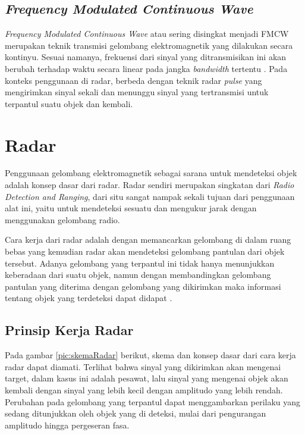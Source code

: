 \subsection{\textit{Frequency Modulated Continuous Wave}}
\textit{Frequency Modulated Continuous Wave} atau sering disingkat menjadi FMCW merupakan teknik transmisi gelombang elektromagnetik yang dilakukan secara kontinyu. Sesuai namanya, frekuensi dari sinyal yang ditransmisikan ini akan berubah terhadap waktu secara linear pada jangka \textit{bandwidth} tertentu \cite{Jankiraman2018}. Pada konteks penggunaan di radar, berbeda dengan teknik radar \textit{pulse} yang mengirimkan sinyal sekali dan menunggu sinyal yang tertransmisi untuk terpantul suatu objek dan kembali. 

\section{Radar}

Penggunaan gelombang elektromagnetik sebagai sarana untuk mendeteksi objek adalah konsep dasar dari radar. Radar sendiri merupakan singkatan dari \textit{Radio Detection and Ranging}, dari situ sangat nampak sekali tujuan dari penggunaan alat ini, yaitu untuk mendeteksi sesuatu dan mengukur jarak dengan menggunakan gelombang radio. 

Cara kerja dari radar adalah dengan memancarkan gelombang di dalam ruang bebas yang kemudian radar akan mendeteksi gelombang pantulan dari objek tersebut. Adanya gelombang yang terpantul ini tidak hanya menunjukkan keberadaan dari suatu objek, namun dengan membandingkan gelombang pantulan yang diterima dengan gelombang yang dikirimkan maka informasi tentang objek yang terdeteksi dapat didapat \cite{Skolnik2001}.

\subsection{Prinsip Kerja Radar}
\label{sect:prinsipKerjaRadar}
Pada gambar \ref{pic:skemaRadar} berikut, skema dan konsep dasar dari cara kerja radar dapat diamati. Terlihat bahwa sinyal yang dikirimkan akan mengenai target, dalam kasus ini adalah pesawat, lalu sinyal yang mengenai objek akan kembali dengan sinyal yang lebih kecil dengan amplitudo yang lebih rendah. Perubahan pada gelombang yang terpantul dapat menggambarkan perilaku yang sedang ditunjukkan oleh objek yang di deteksi, mulai dari pengurangan amplitudo hingga pergeseran fasa.

